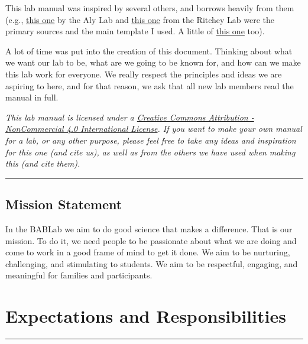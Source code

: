 \documentclass[]{book}
\begin{document}
This lab manual was inspired by several others, and borrows heavily from them (e.g., \href{https://github.com/alylab/labmanual/blob/master/aly-lab-manual.pdf}{this one} by the Aly Lab and \href{https://github.com/memobc/memolab-manual}{this one} from the Ritchey Lab were the primary sources and the main template I used. A little of \href{https://github.com/jpeelle/peellelab_manual/blob/master/peellelab_manual.pdf}{this one} too).

A lot of time was put into the creation of this document. Thinking about what we want our lab to be, what are we going to be known for, and how can we make this lab work for everyone. We really respect the principles and ideas we are aspiring to here, and for that reason, we ask that all new lab members read the manual in full.

\emph{This lab manual is licensed under a \href{https://creativecommons.org/licenses/by-nc/4.0/}{Creative Commons Attribution - NonCommercial 4.0 International License}. If you want to make your own manual for a lab, or any other purpose, please feel free to take any ideas and inspiration for this one (and cite us), as well as from the others we have used when making this (and cite them).}

\begin{center}\rule{0.5\linewidth}{\linethickness}\end{center}

\hypertarget{mission-statement}{%
\section{Mission Statement}\label{mission-statement}}

In the BABLab we aim to do good science that makes a difference. That is our mission. To do it, we need people to be passionate about what we are doing and come to work in a good frame of mind to get it done. We aim to be nurturing, challenging, and stimulating to students. We aim to be respectful, engaging, and meaningful for families and participants.

\hypertarget{expectations-and-responsibilities}{%
\chapter{Expectations and Responsibilities}\label{expectations-and-responsibilities}}

\begin{center}\rule{0.5\linewidth}{\linethickness}\end{center}
\end{document}
